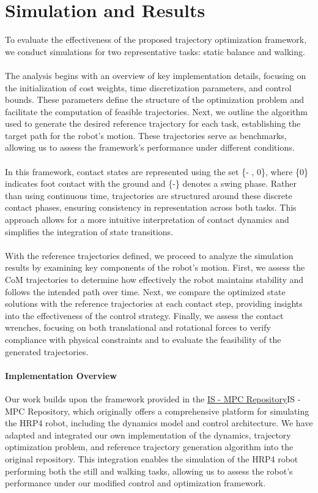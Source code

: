 \documentclass[main.tex]{subfiles}
\begin{document}
 
\begin{sloppypar}
\section{Simulation and Results}
\label{sec:newsimulation}
To evaluate the effectiveness of the proposed trajectory optimization framework, we conduct simulations for two representative tasks: static balance and walking. \\
\\
The analysis begins with an overview of key implementation details, focusing on the initialization of cost weights, time discretization parameters, and control bounds. These parameters define the structure of the optimization problem and facilitate the computation of feasible trajectories. Next, we outline the algorithm used to generate the desired reference trajectory for each task, establishing the target path for the robot’s motion. These trajectories serve as benchmarks, allowing us to assess the framework’s performance under different conditions.\\
\\
In this framework, contact states are represented using the set \{- , 0\}, where \{0\} indicates foot contact with the ground and \{-\} denotes a swing phase. Rather than using continuous time, trajectories are structured around these discrete contact phases, ensuring consistency in representation across both tasks. This approach allows for a more intuitive interpretation of contact dynamics and simplifies the integration of state transitions. \\
\\
With the reference trajectories defined, we proceed to analyze the simulation results by examining key components of the robot’s motion. First, we assess the CoM trajectories to determine how effectively the robot maintains stability and follows the intended path over time. Next, we compare the optimized state solutions with the reference trajectories at each contact step, providing insights into the effectiveness of the control strategy. Finally, we assess the contact wrenches, focusing on both translational and rotational forces to verify compliance with physical constraints and to evaluate the feasibility of the generated trajectories. \\
\paragraph{Implementation Overview}
Our work builds upon the framework provided in the \href{https://github.com/DIAG-Robotics-Lab/ismpc}{IS - MPC Repository}{IS - MPC Repository}, which originally offers a comprehensive platform for simulating the HRP4 robot, including the dynamics model and control architecture. We have adapted and integrated our own implementation of the dynamics, trajectory optimization problem, and reference trajectory generation algorithm into the original repository. This integration enables the simulation of the HRP4 robot performing both the still and walking tasks, allowing us to assess the robot’s performance under our modified control and optimization framework.

\end{sloppypar}
\end{document}
